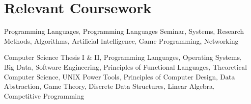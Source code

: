 \section{Relevant Coursework}

%
{}%
{}%
{}%
{Programming Languages, Programming Languages Seminar, Systems, Research
Methods, Algorithms, Artificial Intelligence, Game Programming, Networking%
\newline{}
}

%
{}%
{}%
{}%
{Computer Science Thesis I \& II, Programming Languages, Operating Systems, Big
Data, Software Engineering, Principles of Functional Languages, Theoretical
Computer Science, UNIX Power Tools, Principles of Computer Design, Data
Abstraction, Game Theory, Discrete Data Structures, Linear Algebra, Competitive
Programming
\newline{}
}